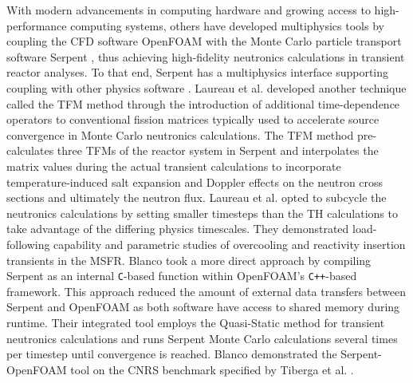With modern advancements in computing hardware and growing access to
high-performance computing systems, others have developed multiphysics tools by
coupling the \gls{CFD} software OpenFOAM
\cite{the_openfoam_foundation_ltd_openfoam_2021} with the Monte Carlo particle
transport software Serpent \cite{leppanen_serpent_2014}, thus achieving
high-fidelity neutronics calculations in transient reactor analyses. To that end,
Serpent has a multiphysics interface supporting coupling
with other physics software \cite{leppanen_development_2013}. Laureau et al.
\cite{laureau_transient_2017} developed another technique called the
\gls{TFM} method through the introduction of additional time-dependence
operators to conventional fission matrices typically used to accelerate source
convergence in Monte Carlo neutronics calculations. The \gls{TFM} method
pre-calculates three \glspl{TFM} of the reactor system in Serpent and
interpolates the matrix values during the actual transient calculations to
incorporate temperature-induced salt expansion and Doppler
effects on the neutron cross sections and ultimately the neutron flux. Laureau et al. opted to
subcycle the neutronics calculations by setting smaller timesteps than the \gls{TH} calculations
to take advantage of the differing physics timescales. They demonstrated load-following capability
and parametric studies of overcooling and reactivity insertion transients in the \gls{MSFR}.
Blanco \cite{blanco_neutronic_2020} took a more direct approach by
compiling Serpent as an internal \texttt{C}-based function within OpenFOAM's
\texttt{C++}-based framework. This approach reduced the amount of external data
transfers between Serpent and OpenFOAM as both software have access to shared
memory during runtime. Their integrated tool employs the Quasi-Static
method for transient neutronics calculations and runs Serpent Monte Carlo
calculations several times per timestep until convergence is reached.
Blanco demonstrated the Serpent-OpenFOAM tool on the CNRS benchmark specified by Tiberga et al.
\cite{tiberga_results_2020}.

